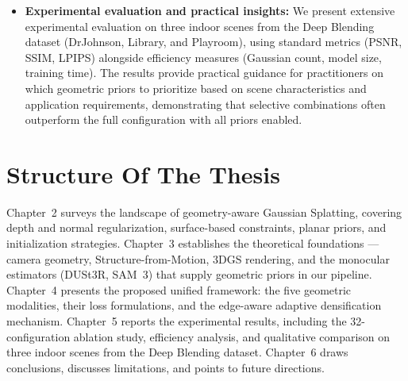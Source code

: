 \begin{itemize}
    \item \textbf{Experimental evaluation and practical insights:} We present extensive experimental evaluation on three indoor scenes from the Deep Blending dataset (DrJohnson, Library, and Playroom), using standard metrics (PSNR, SSIM, LPIPS) alongside efficiency measures (Gaussian count, model size, training time). The results provide practical guidance for practitioners on which geometric priors to prioritize based on scene characteristics and application requirements, demonstrating that selective combinations often outperform the full configuration with all priors enabled.
\end{itemize}


\section{Structure Of The Thesis}

Chapter~2 surveys the landscape of geometry-aware Gaussian Splatting, covering depth and normal regularization, surface-based constraints, planar priors, and initialization strategies. Chapter~3 establishes the theoretical foundations — camera geometry, Structure-from-Motion, 3DGS rendering, and the monocular estimators (DUSt3R, SAM~3) that supply geometric priors in our pipeline. Chapter~4 presents the proposed unified framework: the five geometric modalities, their loss formulations, and the edge-aware adaptive densification mechanism. Chapter~5 reports the experimental results, including the 32-configuration ablation study, efficiency analysis, and qualitative comparison on three indoor scenes from the Deep Blending dataset. Chapter~6 draws conclusions, discusses limitations, and points to future directions.